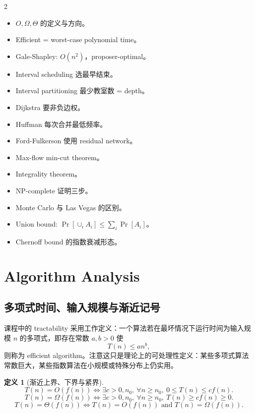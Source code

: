 \documentclass[UTF8,a4paper,11pt]{ctexart}
\newtheorem{definition}[theorem]{定义}
\begin{document}
\begin{multicols}{2}
\begin{itemize}
  \item $O,\Omega,\Theta$ 的定义与方向。
  \item Efficient = worst-case polynomial time。
  \item Gale-Shapley: $O(n^2)$，proposer-optimal。
  \item Interval scheduling 选最早结束。
  \item Interval partitioning 最少教室数 = depth。
  \item Dijkstra 要非负边权。
  \item Huffman 每次合并最低频率。
  \item Ford-Fulkerson 使用 residual network。
  \item Max-flow min-cut theorem。
  \item Integrality theorem。
  \item NP-complete 证明三步。
  \item Monte Carlo 与 Las Vegas 的区别。
  \item Union bound: $\Pr[\cup_i A_i]\le \sum_i\Pr[A_i]$。
  \item Chernoff bound 的指数衰减形态。
\end{itemize}
\end{multicols}

\newpage
\section{Algorithm Analysis}

\subsection{多项式时间、输入规模与渐近记号}

课程中的 tractability 采用工作定义：一个算法若在最坏情况下运行时间为输入规模 $n$ 的多项式，即存在常数 $a,b>0$ 使
\[
T(n)\le a n^b,
\]
则称为 efficient algorithm。注意这只是理论上的可处理性定义：某些多项式算法常数巨大，某些指数算法在小规模或特殊分布上仍实用。

\begin{definition}[渐近上界、下界与紧界]
\[
T(n)=O(f(n)) \iff \exists c>0,n_0,\ \forall n\ge n_0,\ 0\le T(n)\le c f(n).
\]
\[
T(n)=\Omega(f(n)) \iff \exists c>0,n_0,\ \forall n\ge n_0,\ T(n)\ge c f(n)\ge 0.
\]
\[
T(n)=\Theta(f(n)) \iff T(n)=O(f(n)) \text{ and } T(n)=\Omega(f(n)).
\]
\end{definition}
\end{document}
